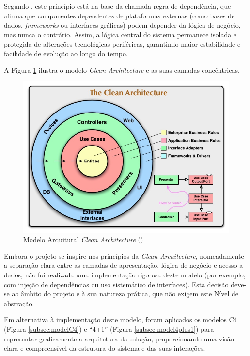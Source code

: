 Segundo \cite{Lano2023}, este princípio está na base da chamada regra de dependência, que afirma que componentes dependentes de plataformas externas (como bases de dados, \textit{frameworks} ou interfaces gráficas) podem depender da lógica de negócio, mas nunca o contrário. Assim, a lógica central do sistema permanece isolada e protegida de alterações tecnológicas periféricas, garantindo maior estabilidade e facilidade de evolução ao longo do tempo.

A Figura \ref{fig:cleanArchitecture} ilustra o modelo \textit{Clean Architecture} e as suas camadas concêntricas.

\begin{figure}[H]
    \centering
    \includegraphics[width=\linewidth,keepaspectratio]{frontmatter/assets/models/CleanArchitecture.jpg}
    \caption{Modelo Arquitural \textit{Clean Architecture} (\cite{Martin2012})}
    \label{fig:cleanArchitecture}
\end{figure}

Embora o projeto se inspire nos princípios da \textit{Clean Architecture}, nomeadamente a separação clara entre as camadas de apresentação, lógica de negócio e acesso a dados, não foi realizada uma implementação rigorosa deste modelo (por exemplo, com injeção de dependências ou uso sistemático de interfaces). Esta decisão deve-se ao âmbito do projeto e à sua natureza prática, que não exigem este Nível de abstração.

Em alternativa à implementação deste modelo, foram aplicados os modelos C4 (Figura \ref{subsec:modelC4}) e “4+1” (Figura \ref{subsec:model4plus1}) para representar graficamente a arquitetura da solução, proporcionando uma visão clara e compreensível da estrutura do sistema e das suas interações.


